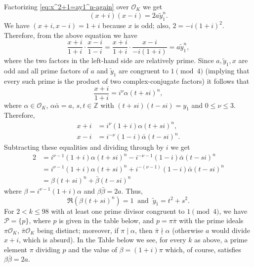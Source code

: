 \documentclass[12pt]{amsart}
\numberwithin{equation}{section}
\theoremstyle{definition}
\theoremstyle{remark}
\newcommand{\ZZ}{\mathbb{Z}}
\newcommand{\cP}{\mathcal{P}}
\newcommand{\OK}{\mathcal{O}_K}
\newcommand{\ty}{\tilde{y}}
\begin{document}
Factorizing \eqref{eq:x^2+1=ay1^n-again} over $\OK$ we get
\begin{equation*}
    (x + i) (x - i)=2a\ty_1^n.
\end{equation*}
We have $(x + i, x - i) = 1 + i$ because $x$ is odd; also,
$2=-i(1 + i)^2$. Therefore, from the above equation we have
\begin{equation*}
    \frac{x+i}{1+i}\cdot\frac{x-i}{1-i}=
    \frac{x+i}{1+i}\cdot \frac{x-i}{-i(1+i)} =a\ty_1^n,
\end{equation*}
%
where the two factors in the left-hand side are relatively prime.
Since $a, \ty_1, x$ are odd and all prime factors of $a$ and  $\ty_1$ are congruent to $1\pmod{4}$ (implying that every such prime is the product of two complex-conjugate factors) it follows that 
%
\begin{equation*}
    \frac{x+i}{1+i} = i^{\nu}\alpha (t+si)^n,
\end{equation*}
%
where $\alpha\in\OK$, $\alpha\bar{\alpha}=a$, $s,t\in\ZZ$ with $(t+si)(t-si)=y_1$ and $0\le\nu\le 3$. Therefore, 
\begin{align*}
x+i & = i^{\nu}(1+i)\alpha (t+si)^n, \\ 
x-i & =i^{-\nu}(1-i)\bar{\alpha}(t-si)^n.
\end{align*}
Subtracting these equalities 
and dividing through by $i$ we get
%
\begin{align*}
    2 & =i^{\nu-1}(1+i)\alpha (t+si)^n -
    i^{-\nu-1}(1-i)\bar{\alpha}(t-si)^n 
      \\
    & = i^{\nu-1}(1+i)\alpha (t+si)^n +
   i^{-(\nu-1)}(1-i)\bar{\alpha}(t-si)^n
     \\
   & = \beta (t+si)^n +\bar{\beta}(t-si)^n
\end{align*}
%
where $\beta=i^{\nu-1}(1+i)\alpha$ and $\beta\bar{\beta}=2a$.
Thus,
%
\begin{equation}   \label{eq:Thue_and_y1}
    \Re\left(\beta (t+si)^n\right)=1\;\;\text{and}\;\; \ty_1=t^2+s^2.
\end{equation}
%
For $2<k\le 98$ with at least one prime divisor congruent to $1\pmod 4$, we have
$\cP=\{p\}$, where $p$ is given in the table below, and
$p=\pi\bar{\pi}$ with the prime ideals $\pi\OK$, $\bar{\pi}\OK$ 
being distinct; moreover, if $\pi\mid\alpha$, then 
$\bar{\pi}\nmid\alpha$ (otherwise $a$ would divide $x+i$, which is 
absurd). In the Table below we see, for every $k$ as above, 
a prime element $\pi$ dividing $p$ and the value of 
$\beta=(1+i)\pi$ which, of course, satisfies $\beta\bar{\beta}=2a$.
%
\end{document}
